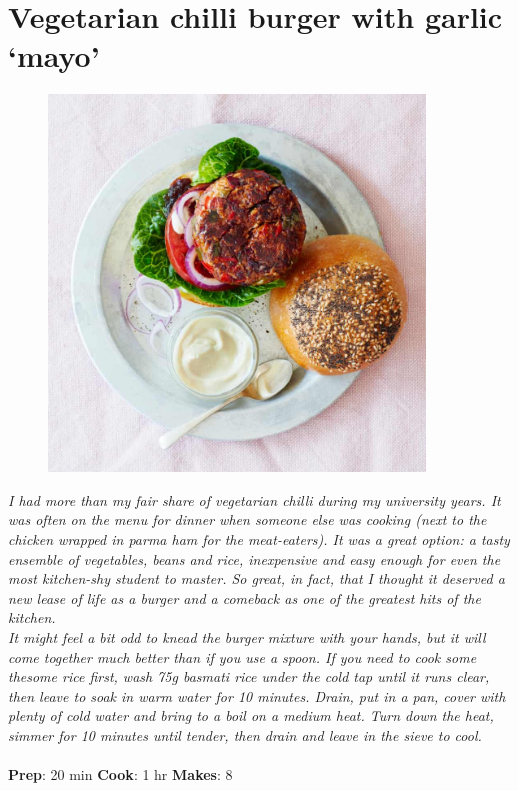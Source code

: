 \documentclass{book}
\begin{document}
\section{Vegetarian chilli burger with garlic ‘mayo’}
\begin{figure}
\centering\includegraphics[width=10cm,height=10cm,keepaspectratio]{Recipe_Pictures/Vegetarian_chilli_burger_with_garlic_mayo.png}
\end{figure}
\emph{I had more than my fair share of vegetarian chilli during my university years. It was often on the menu for dinner when someone else was cooking (next to the chicken wrapped in parma ham for the meat-eaters). It was a great option: a tasty ensemble of vegetables, beans and rice, inexpensive and easy enough for even the most kitchen-shy student to master. So great, in fact, that I thought it deserved a new lease of life as a burger and a comeback as one of the greatest hits of the kitchen.\\ 
It might feel a bit odd to knead the burger mixture with your hands, but it will come together much better than if you use a spoon. If you need to cook some thesome rice first, wash 75g basmati rice under the cold tap until it runs clear, then leave to soak in warm water for 10 minutes. Drain, put in a pan, cover with plenty of cold water and bring to a boil on a medium heat. Turn down the heat, simmer for 10 minutes until tender, then drain and leave in the sieve to cool.}\\\\ 
\textbf{Prep}: 20 min
\textbf{Cook}: 1 hr
\textbf{Makes}: 8
\end{document}
